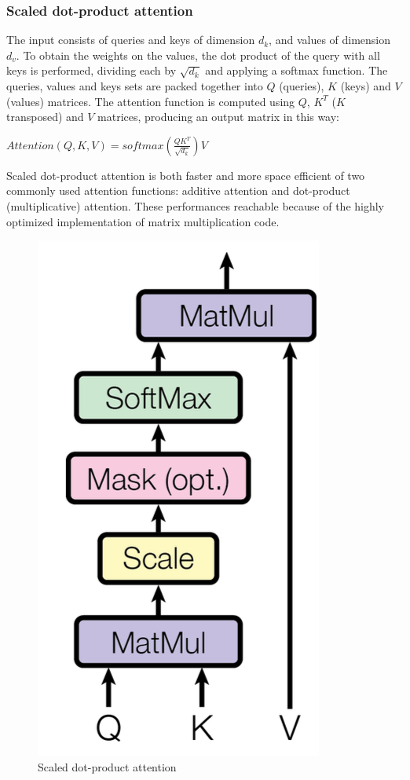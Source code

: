\documentclass[\main/main.tex]{subfiles}
\begin{document}
\subsubsection{Scaled dot-product attention} 
The input consists of queries and keys of dimension $d_k$, and values of dimension $d_v$.
To obtain the weights on the values, the dot product of the query with all keys is performed, dividing each by $\sqrt{d_k}$ and applying a softmax function. The queries, values and keys sets are packed together into $Q$ (queries), $K$ (keys) and $V$ (values) matrices. 
The attention function is computed using $Q$, $K^T$ ($K$ transposed) and $V$ matrices, producing an output matrix in this way:
\begin{center}
    $Attention(Q, K, V) = softmax(\frac{QK^T}{\sqrt{d_k}})V$
\end{center}
Scaled dot-product attention is both faster and more space efficient of two commonly used attention functions: additive attention and dot-product (multiplicative) attention. These performances reachable because of the highly optimized implementation of matrix multiplication code.
\begin{figure}[h!]
    \centering
    \includegraphics[scale=0.35]{images/transformer/scaled_dot_product_attention.png}
    \caption{Scaled dot-product attention}
    \label{fig:scaled_dot-product_attention}
\end{figure}
\end{document}
